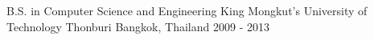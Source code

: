 

\begin{cventries}

  \cventry
    {B.S. in Computer Science and Engineering} %
    {King Mongkut's University of Technology Thonburi} %
    {Bangkok, Thailand} %
    {2009 - 2013} %
    {
    }

\end{cventries}
